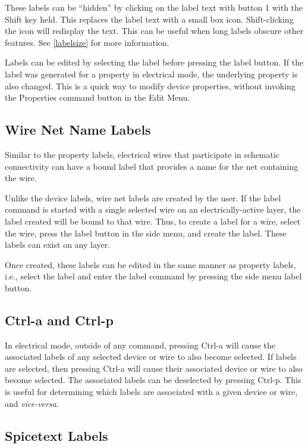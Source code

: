 These labels can be ``hidden'' by clicking on the label text with
button 1 with the {\kb Shift} key held.  This replaces the label text
with a small box icon.  Shift-clicking the icon will redisplay the
text.  This can be useful when long labels obscure other features. 
See \ref{labelsize} for more information.

Labels can be edited by selecting the label before pressing the {\cb
label} button.  If the label was generated for a property in
electrical mode, the underlying property is also changed.  This is a
quick way to modify device properties, without invoking the {\cb
Properties} command button in the {\cb Edit Menu}.

\subsection{Wire Net Name Labels}

Similar to the property labels, electrical wires that participate in
schematic connectivity can have a bound label that provides a name for
the net containing the wire.

Unlike the device labels, wire net labels are created by the user.  If
the {\cb label} command is started with a single selected wire on an
electrically-active layer, the label created will be bound to that
wire.  Thus, to create a label for a wire, select the wire, press the
{\cb label} button in the side menu, and create the label.  These
labels can exist on any layer.

Once created, these labels can be edited in the same manner as
property labels, i.e., select the label and enter the label command by
pressing the side menu {\cb label} button.

\subsection{Ctrl-a and Ctrl-p}

In electrical mode, outside of any command, pressing {\kb Ctrl-a} will
cause the associated labels of any selected device or wire to also
become selected.  If labels are selected, then pressing {\kb Ctrl-a}
will cause their associated device or wire to also become selected. 
The associated labels can be deselected by pressing {\kb Ctrl-p}. 
This is useful for determining which labels are associated with a
given device or wire, and {\it vice-versa}.

\subsection{Spicetext Labels}
\label{spicetext}

